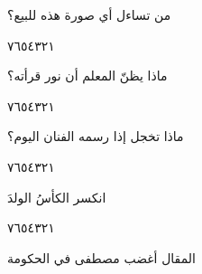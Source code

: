 \documentclass[11pt, a4paper]{article}
\begin{document}
{\vspace{0.5\baselineskip}\begin{flushright}
\textarabic{من تساءل أي صورة هذه للبيع؟}
\end{flushright}

\begin{center}
        \hfill\textarabic{٧}\hfill\textarabic{٦}\hfill\textarabic{٥}\hfill\textarabic{٤}\hfill\textarabic{٣}\hfill\textarabic{٢}\hfill\textarabic{١}
        \end{center}


\vspace{0.5\baselineskip}\begin{flushright}
\textarabic{ماذا يظنّ المعلم أن نور قرأته؟}
\end{flushright}

\begin{center}
        \hfill\textarabic{٧}\hfill\textarabic{٦}\hfill\textarabic{٥}\hfill\textarabic{٤}\hfill\textarabic{٣}\hfill\textarabic{٢}\hfill\textarabic{١}
        \end{center}


\vspace{0.5\baselineskip}\begin{flushright}
\textarabic{ماذا تخجل إذا رسمه الفنان اليوم؟}
\end{flushright}

\begin{center}
        \hfill\textarabic{٧}\hfill\textarabic{٦}\hfill\textarabic{٥}\hfill\textarabic{٤}\hfill\textarabic{٣}\hfill\textarabic{٢}\hfill\textarabic{١}
        \end{center}

\vfill\clearpage

\vspace{0.5\baselineskip}\begin{flushright}
\textarabic{انكسر الكأسُ الولدَ}
\end{flushright}

\begin{center}
        \hfill\textarabic{٧}\hfill\textarabic{٦}\hfill\textarabic{٥}\hfill\textarabic{٤}\hfill\textarabic{٣}\hfill\textarabic{٢}\hfill\textarabic{١}
        \end{center}


\vspace{0.5\baselineskip}\begin{flushright}
\textarabic{المقال أغضب مصطفى في الحكومة}
\end{flushright}

}
\end{document}
